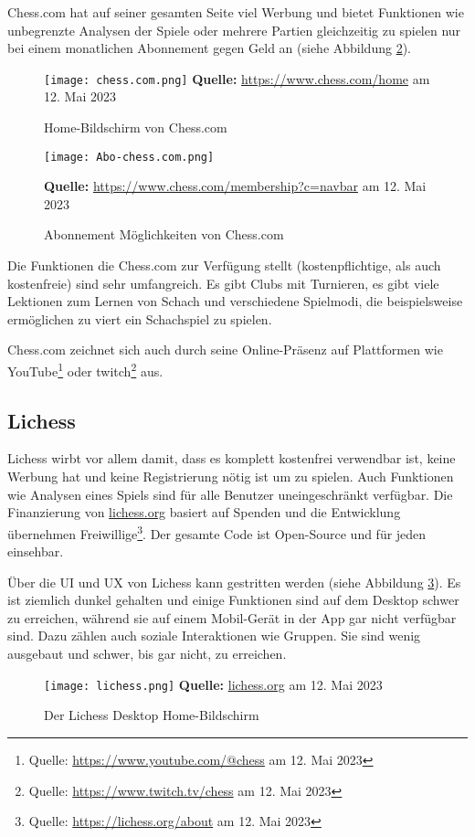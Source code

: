 Chess.com hat auf seiner gesamten Seite viel Werbung und bietet Funktionen wie unbegrenzte Analysen der Spiele oder mehrere Partien gleichzeitig zu spielen nur bei einem monatlichen Abonnement gegen Geld an (siehe Abbildung \ref{fig:chess.com-abo}).

  \begin{figure}[htb]
  \centering
  \texttt{[image: chess.com.png]}
\raggedleft
    \footnotesize\sffamily\textbf{Quelle:} \url{https://www.chess.com/home} am 12. Mai 2023
  \caption{Home-Bildschirm von Chess.com}
  \label{fig:chess.com}
\end{figure}

  \begin{figure}[htb]
  \centering
  \texttt{[image: Abo-chess.com.png]}
  
\raggedleft

    \footnotesize\sffamily\textbf{Quelle:} \url{https://www.chess.com/membership?c=navbar} am 12. Mai 2023
  \caption{Abonnement Möglichkeiten von Chess.com}
  \label{fig:chess.com-abo}
\end{figure}

Die Funktionen die Chess.com zur Verfügung stellt (kostenpflichtige, als auch kostenfreie) sind sehr umfangreich. Es gibt Clubs mit Turnieren, es gibt viele Lektionen zum Lernen von Schach und verschiedene Spielmodi, die beispielsweise ermöglichen zu viert ein Schachspiel zu spielen.

Chess.com zeichnet sich auch durch seine Online-Präsenz auf Plattformen wie YouTube\footnote{Quelle: \url{https://www.youtube.com/@chess} am 12. Mai 2023} oder twitch\footnote{Quelle: \url{https://www.twitch.tv/chess} am 12. Mai 2023} aus.


\subsection{Lichess}
Lichess wirbt vor allem damit, dass es komplett kostenfrei verwendbar ist, keine Werbung hat und keine Registrierung nötig ist um zu spielen. Auch Funktionen wie Analysen eines Spiels sind für alle Benutzer uneingeschränkt verfügbar. Die Finanzierung von \url{lichess.org} basiert auf Spenden und die Entwicklung übernehmen Freiwillige\footnote{Quelle: \url{https://lichess.org/about} am 12. Mai 2023}. Der gesamte Code ist Open-Source und für jeden einsehbar.

Über die UI und UX von Lichess kann gestritten werden (siehe Abbildung \ref{fig:lichess}). Es ist ziemlich dunkel gehalten und einige Funktionen sind auf dem Desktop schwer zu erreichen, während sie auf einem Mobil-Gerät in der App gar nicht verfügbar sind. Dazu zählen auch soziale Interaktionen wie Gruppen. Sie sind wenig ausgebaut und schwer, bis gar nicht, zu erreichen.

  \begin{figure}[htb]
  \centering
  \texttt{[image: lichess.png]}
\raggedleft
    \footnotesize\sffamily\textbf{Quelle:} \url{lichess.org} am 12. Mai 2023
  \caption{Der Lichess Desktop Home-Bildschirm}
  \label{fig:lichess}
\end{figure}